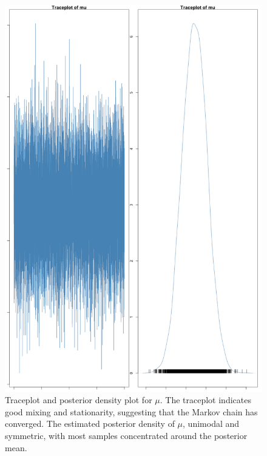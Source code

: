\documentclass[]{article}
\begin{document}
\begin{figure}[H]
	\centering
	\includegraphics[width=0.7\linewidth]{img/img-traceplot-mu}
    \caption{Traceplot and posterior density plot for $\mu$. The traceplot indicates good mixing and stationarity, suggesting that the Markov chain has converged. The estimated posterior density of $\mu$,   unimodal and symmetric, with most samples concentrated around the posterior mean.}
	\label{fig:img-traceplot-mu}
\end{figure}
\end{document}
